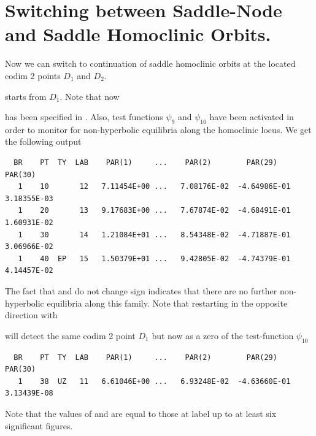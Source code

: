 \documentclass[12pt]{report}
\begin{document}
\section{Switching between Saddle-Node and Saddle Homoclinic Orbits.}
Now we can switch to continuation of saddle homoclinic orbits at the
located codim 2 points $D_1$ and $D_2$. 
\begin{center}
\end{center}
starts from $D_1$. Note that now 
\begin{center}
\end{center}
has been specified in . Also, test functions $\psi_9$
and $\psi_{10}$ have been activated in order
to monitor for non-hyperbolic equilibria along the homoclinic locus. 
We get the following output
\begin{verbatim}
  BR    PT  TY  LAB    PAR(1)     ...    PAR(2)        PAR(29)       PAR(30)    
   1    10       12   7.11454E+00 ...   7.08176E-02  -4.64986E-01   3.18355E-03
   1    20       13   9.17683E+00 ...   7.67874E-02  -4.68491E-01   1.60931E-02
   1    30       14   1.21084E+01 ...   8.54348E-02  -4.71887E-01   3.06966E-02
   1    40  EP   15   1.50379E+01 ...   9.42805E-02  -4.74379E-01   4.14457E-02
\end{verbatim}
The fact that  and  do not change sign indicates 
that there are no further non-hyperbolic equilibria
along this family. Note that restarting in the opposite direction with
\begin{center}
\end{center}
will detect the same codim 2 point $D_1$ but now as a zero
of the test-function $\psi_{10}$
\begin{verbatim}
  BR    PT  TY  LAB    PAR(1)     ...    PAR(2)        PAR(29)       PAR(30)
   1    38  UZ   11   6.61046E+00 ...   6.93248E-02  -4.63660E-01   3.13439E-08
\end{verbatim}
Note that the values of  and  are equal to those
at label  up to at least six significant figures.
\end{document}
